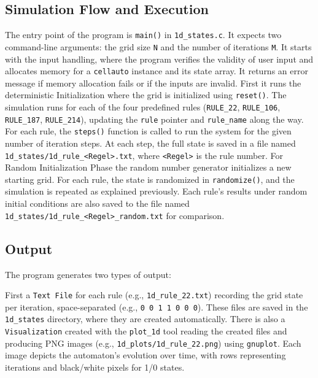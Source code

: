 \documentclass[12pt,a4paper]{article}
\begin{document}
\subsection*{\small Simulation Flow and Execution}
The entry point of the program is \texttt{main()} in \texttt{1d\_states.c}. It expects two command-line arguments: the grid size \texttt{N} and the 
number of iterations \texttt{M}. It starts with the input handling, where the program verifies the validity of user input and 
allocates memory for a \texttt{cellauto} instance and its state array. It returns an error message if memory allocation fails or 
if the inputs are invalid.
\newline
First it runs the deterministic Initialization where the grid is initialized using \texttt{reset()}. The simulation runs for each 
of the four predefined rules (\texttt{RULE\_22}, \texttt{RULE\_106}, \texttt{RULE\_187}, \texttt{RULE\_214}), updating the \texttt{rule} pointer and \texttt{rule\_name} along the 
way. For each rule, the \texttt{steps()} function is called to run the system for the given number of iteration steps. At each step, 
the full state is saved in a file named \texttt{1d\_states/1d\_rule\_<Regel>.txt}, where \texttt{<Regel>} is the rule number.
\newline
For Random Initialization Phase the random number generator initializes a new starting grid. For each rule, the state is 
randomized in \texttt{randomize()}, and the simulation is repeated as explained previously. Each rule’s results under random initial 
conditions are also saved to the file named \texttt{1d\_states/1d\_rule\_<Regel>\_random.txt} for comparison.
\newline

\vspace{1cm}


\subsection{Output}
The program generates two types of output:
\newline
\vspace{0.1 cm}

First a \texttt{Text File} for each rule (e.g., \texttt{1d\_rule\_22.txt}) recording the grid state per iteration, 
space-separated (e.g., \texttt{0 0 1 1 0 0 0}). 
These files are saved in the \texttt{1d\_states} directory, where they are created automatically.
\newline
There is also a \texttt{Visualization} created with the \texttt{plot\_1d} tool reading the created files and producing 
PNG images (e.g., \texttt{1d\_plots/1d\_rule\_22.png}) using \texttt{gnuplot}. Each image depicts the automaton's evolution 
over time, with rows representing iterations and black/white pixels for 1/0 states.
\newline
\vspace{0.1 cm}
\end{document}
